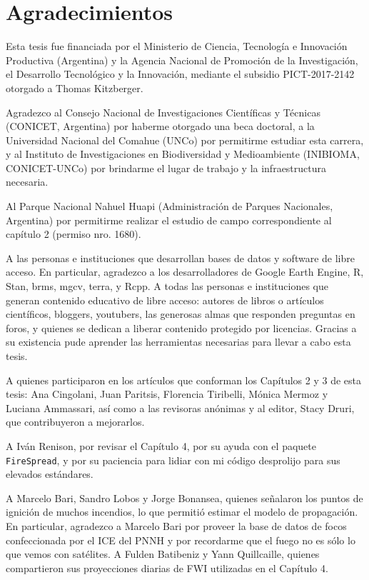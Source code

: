\newpage{\ }
\cleardoublepage

\thispagestyle{empty}
\chapter*{Agradecimientos}

Esta tesis fue financiada por el Ministerio de Ciencia, Tecnología e Innovación Productiva (Argentina) y la Agencia Nacional de Promoción de la Investigación, el Desarrollo Tecnológico y la Innovación, mediante el subsidio PICT-2017-2142 otorgado a Thomas Kitzberger. 

Agradezco al Consejo Nacional de Investigaciones Científicas y Técnicas (CONICET, Argentina) por haberme otorgado una beca doctoral, a la Universidad Nacional del Comahue (UNCo) por permitirme estudiar esta carrera, y al Instituto de Investigaciones en Biodiversidad y Medioambiente (INIBIOMA, CONICET-UNCo) por brindarme el lugar de trabajo y la infraestructura necesaria.

Al Parque Nacional Nahuel Huapi (Administración de Parques Nacionales, Argentina) por permitirme realizar el estudio de campo correspondiente al capítulo 2 (permiso nro. 1680). 

A las personas e instituciones que desarrollan bases de datos y software de libre acceso. En particular, agradezco a los desarrolladores de Google Earth Engine, R, Stan, brms, mgcv, terra, y Rcpp. A todas las personas e instituciones que generan contenido educativo de libre acceso: autores de libros o artículos científicos, bloggers, youtubers, las generosas almas que responden preguntas en foros, y quienes se dedican a liberar contenido protegido por licencias. Gracias a su existencia pude aprender las herramientas necesarias para llevar a cabo esta tesis.  

A quienes participaron en los artículos que conforman los Capítulos 2 y 3 de esta tesis: Ana Cingolani, Juan Paritsis, Florencia Tiribelli, Mónica Mermoz y Luciana Ammassari, así como a las revisoras anónimas y al editor, Stacy Druri, que contribuyeron a mejorarlos. 

A Iván Renison, por revisar el Capítulo 4, por su ayuda con el paquete \texttt{FireSpread}, y por su paciencia para lidiar con mi código desprolijo para sus elevados estándares.

A Marcelo Bari, Sandro Lobos y Jorge Bonansea, quienes señalaron los puntos de ignición de muchos incendios, lo que permitió estimar el modelo de propagación. En particular, agradezco a Marcelo Bari por proveer la base de datos de focos confeccionada por el ICE del PNNH y por recordarme que el fuego no es sólo lo que vemos con satélites. A Fulden Batibeniz y Yann Quillcaille, quienes compartieron sus proyecciones diarias de FWI utilizadas en el Capítulo 4.

